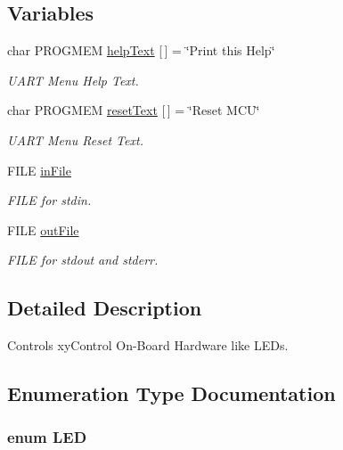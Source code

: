 \subsection*{Variables}
\begin{DoxyCompactItemize}
\item 
char P\-R\-O\-G\-M\-E\-M \hyperlink{group__xycontrol_gab29cf1c6b0f1a36311899902ec9364ea}{help\-Text} \mbox{[}$\,$\mbox{]} = \char`\"{}Print this Help\char`\"{}
\begin{DoxyCompactList}\small\item\em U\-A\-R\-T Menu Help Text. \end{DoxyCompactList}\item 
char P\-R\-O\-G\-M\-E\-M \hyperlink{group__xycontrol_ga27915b4caf41f74542980a4ea0f1726a}{reset\-Text} \mbox{[}$\,$\mbox{]} = \char`\"{}Reset M\-C\-U\char`\"{}
\begin{DoxyCompactList}\small\item\em U\-A\-R\-T Menu Reset Text. \end{DoxyCompactList}\item 
F\-I\-L\-E \hyperlink{group__xycontrol_gaad0ab56da43b41bbfeeaa3d1eca70e9c}{in\-File}
\begin{DoxyCompactList}\small\item\em F\-I\-L\-E for stdin. \end{DoxyCompactList}\item 
F\-I\-L\-E \hyperlink{group__xycontrol_gaa9e0cac6f45e381f488c1dd9a8418ca2}{out\-File}
\begin{DoxyCompactList}\small\item\em F\-I\-L\-E for stdout and stderr. \end{DoxyCompactList}\end{DoxyCompactItemize}


\subsection{Detailed Description}
Controls xy\-Control On-\/\-Board Hardware like L\-E\-Ds. 

\subsection{Enumeration Type Documentation}
\hypertarget{group__xycontrol_gaadcb6002d2b42fdfe01490f730ab00a6}{
\subsubsection[{L\-E\-D}]{\setlength{\rightskip}{0pt plus 5cm}enum {\bf L\-E\-D}}}\label{group__xycontrol_gaadcb6002d2b42fdfe01490f730ab00a6}


